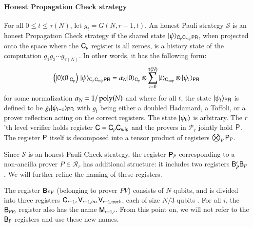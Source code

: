 \paragraph{Honest Propagation Check strategy} For all $0 \leq t \leq \tau(N)$, let $g_t = G(N,r-1,t)$. An honest Pauli strategy $\mathcal{S}$ is an honest Propagation Check strategy if the shared state $|\psi\rangle_{{\mathsf{C}}_p {\mathsf{C}}_{mip} {\mathsf{P}} {\mathsf{R}}}$, when projected onto the space where the ${\mathsf{C}}_p$ register is all zeroes, is a history state of the computation $g_1g_2\cdots g_{\tau(N)}$. In other words, it has the following form:
\[
	\left( |0\rangle\! \langle 0|_{{\mathsf{C}}_p} \right) \, |\psi\rangle_{{\mathsf{C}}_p {\mathsf{C}}_{mip} {\mathsf{P}} {\mathsf{R}}} = \alpha_N |0\rangle_{{\mathsf{C}}_p} \otimes \sum_{t = 0}^{\tau(N)} |t\rangle_{{\mathsf{C}}_{mip}} \otimes |\psi_t\rangle_{{\mathsf{P}} {\mathsf{R}}}
\]
for some normalization $\alpha_N = 1/\operatorname{poly}(N)$ and where for all $t$, the state $|\psi_t\rangle_{{\mathsf{P}} {\mathsf{R}}}$ is defined to be $g_t |\psi_{t-1}\rangle_{{\mathsf{P}} {\mathsf{R}}}$ with $g_t$ being either a doubled Hadamard, a Toffoli, or a prover reflection acting on the correct registers. The state $|\psi_0\rangle$ is arbitrary. The $r$'th level verifier holds register ${\mathsf{C}} = {\mathsf{C}}_p {\mathsf{C}}_{mip}$ and the provers in $\mathcal{P}_r$ jointly hold ${\mathsf{P}}$. The register ${\mathsf{P}}$ itself is decomposed into a tensor product of registers $\bigotimes_P {\mathsf{P}}_P$. 

Since $\mathcal{S}$ is an honest Pauli Check strategy, the register ${\mathsf{P}}_P$ corresponding to a non-ancilla prover $P \in \mathcal{R}_r$ has additional structure: it includes two registers ${\mathsf{B}}_P' {\mathsf{B}}_P$. We will further refine the naming of these registers.

The register ${\mathsf{B}}_{PV}$ (belonging to prover $PV$) consists of $N$ qubits, and is divided into three registers ${\mathsf{C}}_{r-1}, {\mathsf{V}}_{r-1,in}, {\mathsf{V}}_{r-1,work}$, each of size $N/3$ qubits . 
For all $i$, the ${\mathsf{B}}_{PP_i}$ register also has the name ${\mathsf{M}}_{r-1,i}$. From this point on, we will not refer to the ${\mathsf{B}}_P$ registers and use these new names.

